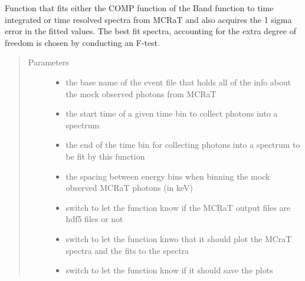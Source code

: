\documentclass[letterpaper,10pt,english]{sphinxmanual}
\begin{document}
\begin{fulllineitems}
\label{\detokenize{read_process_files:read_process_files.cfit}}
Function that fits either the COMP function of the Band function to time integrated or time resolved spectra from
MCRaT and also acquires the 1 sigma error in the fitted values. The best fit spectra, accounting for the extra
degree of freedom is chosen by conducting an F-test.
\begin{quote}\begin{description}
\item[{Parameters}] \leavevmode\begin{itemize}
\item {} 
 \textendash{} the base name of the event file that holds all of the info about the mock observed photons
from MCRaT

\item {} 
 \textendash{} the start time of a given time bin to collect photons into a spectrum

\item {} 
 \textendash{} the end of the time bin for collecting photons into a spectrum to be fit by this function

\item {} 
 \textendash{} the spacing between energy bins when binning the mock observed MCRaT photons (in keV)

\item {} 
 \textendash{} switch to let the function know if the MCRaT output files are hdf5 files or not

\item {} 
 \textendash{} switch to let the function knwo that it should plot the MCraT spectra and the fits to the spectra

\item {} 
 \textendash{} switch to let the function know if it should save the plots


\end{itemize}
\end{description}
\end{quote}
\end{fulllineitems}
\end{document}
